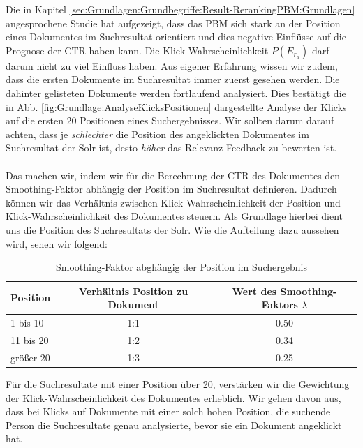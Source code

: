 Die in Kapitel \ref{sec:Grundlagen:Grundbegriffe:Result-RerankingPBM:Grundlagen} angesprochene Studie \cite{pbm} hat aufgezeigt, dass das PBM sich stark an der Position eines Dokumentes im Suchresultat orientiert und dies negative Einflüsse auf die Prognose der CTR haben kann. Die Klick-Wahrscheinlichkeit $P(E_{r_{u}})$ darf darum nicht zu viel Einfluss haben. Aus eigener Erfahrung wissen wir zudem, dass die ersten Dokumente im Suchresultat immer zuerst gesehen werden. Die dahinter gelisteten Dokumente werden fortlaufend analysiert. Dies bestätigt die in Abb. \ref{fig:Grundlage:AnalyseKlicksPositionen} dargestellte Analyse der Klicks auf die ersten 20 Positionen eines Suchergebnisses. Wir sollten darum darauf achten, dass je \textit{schlechter} die Position des angeklickten Dokumentes im Suchresultat der Solr ist, desto \textit{höher} das Relevanz-Feedback zu bewerten ist. 
\\
\\
Das machen wir, indem wir für die Berechnung der CTR des Dokumentes den Smoothing-Faktor abhängig der Position im Suchresultat definieren. Dadurch können wir das Verhältnis zwischen Klick-Wahrscheinlichkeit der Position und Klick-Wahrscheinlichkeit des Dokumentes steuern. Als Grundlage hierbei dient uns die Position des Suchresultats der Solr. Wie die Aufteilung dazu aussehen wird, sehen wir folgend:

\begin{table}[H]
\centering
\vspace{-.75em}
 \caption[Smoothing-Faktor abghängig der Position im Suchergebnis]{Smoothing-Faktor abghängig der Position im Suchergebnis}
\label{tab:VerhaeltnisKlick-WahrscheinlichkeitenPositionDokument}
\vspace{-.5em}
\footnotesize
\renewcommand*{\arraystretch}{1.2}
\begin{tabular}{lcc} \hline
	\textbf{Position} & \textbf{Verhältnis Position zu Dokument} & \textbf{Wert des Smoothing-Faktors $\lambda$}\\ \hline
	1 bis 10 & 1:1 & 0.50\\ \hline
	11 bis 20 & 1:2 & 0.34\\ \hline
	größer 20 &  1:3 & 0.25\\ \hline
 \end{tabular}
\vspace{-2em}
\end{table}

Für die Suchresultate mit einer Position über 20, verstärken wir die Gewichtung der Klick-Wahrscheinlichkeit des Dokumentes erheblich. Wir gehen davon aus, dass bei Klicks auf Dokumente mit einer solch hohen Position, die suchende Person die Suchresultate genau analysierte, bevor sie ein Dokument angeklickt hat.

